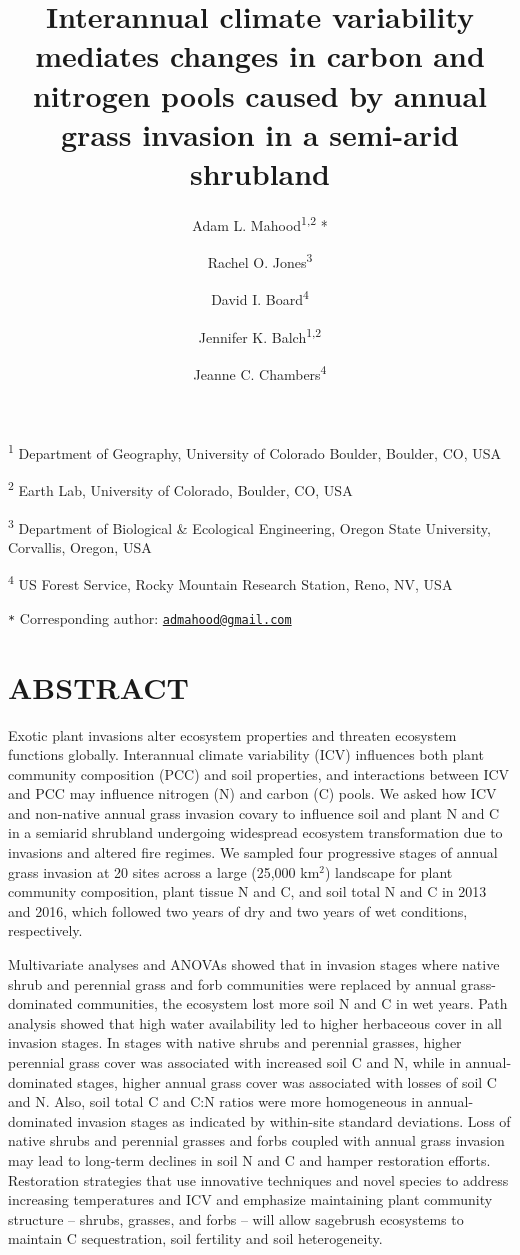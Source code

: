\documentclass[
  11pt,
  a4paper,
]{article}
\title{Interannual climate variability mediates changes in carbon and nitrogen pools caused by annual grass invasion in a semi-arid shrubland}
\author{Adam L. Mahood\textsuperscript{1,2} * \and Rachel O. Jones\textsuperscript{3} \and David I. Board\textsuperscript{4} \and Jennifer K. Balch\textsuperscript{1,2} \and Jeanne C. Chambers\textsuperscript{4}}
\date{}
\begin{document}
\maketitle

\small

\textsuperscript{1} Department of Geography, University of Colorado Boulder, Boulder, CO, USA

\textsuperscript{2} Earth Lab, University of Colorado, Boulder, CO, USA

\textsuperscript{3} Department of Biological \& Ecological Engineering, Oregon State University, Corvallis, Oregon, USA

\textsuperscript{4} US Forest Service, Rocky Mountain Research Station, Reno, NV, USA

\texttt{*} Corresponding author: \href{mailto:admahood@gmail.com}{\nolinkurl{admahood@gmail.com}}

\normalsize

\newpage

\hypertarget{abstract}{%
\section{ABSTRACT}\label{abstract}}

Exotic plant invasions alter ecosystem properties and threaten ecosystem functions globally. Interannual climate variability (ICV) influences both plant community composition (PCC) and soil properties, and interactions between ICV and PCC may influence nitrogen (N) and carbon (C) pools. We asked how ICV and non-native annual grass invasion covary to influence soil and plant N and C in a semiarid shrubland undergoing widespread ecosystem transformation due to invasions and altered fire regimes. We sampled four progressive stages of annual grass invasion at 20 sites across a large (25,000 km\(^2\)) landscape for plant community composition, plant tissue N and C, and soil total N and C in 2013 and 2016, which followed two years of dry and two years of wet conditions, respectively.

Multivariate analyses and ANOVAs showed that in invasion stages where native shrub and perennial grass and forb communities were replaced by annual grass-dominated communities, the ecosystem lost more soil N and C in wet years. Path analysis showed that high water availability led to higher herbaceous cover in all invasion stages. In stages with native shrubs and perennial grasses, higher perennial grass cover was associated with increased soil C and N, while in annual-dominated stages, higher annual grass cover was associated with losses of soil C and N. Also, soil total C and C:N ratios were more homogeneous in annual-dominated invasion stages as indicated by within-site standard deviations. Loss of native shrubs and perennial grasses and forbs coupled with annual grass invasion may lead to long-term declines in soil N and C and hamper restoration efforts. Restoration strategies that use innovative techniques and novel species to address increasing temperatures and ICV and emphasize maintaining plant community structure -- shrubs, grasses, and forbs -- will allow sagebrush ecosystems to maintain C sequestration, soil fertility and soil heterogeneity.
\end{document}
